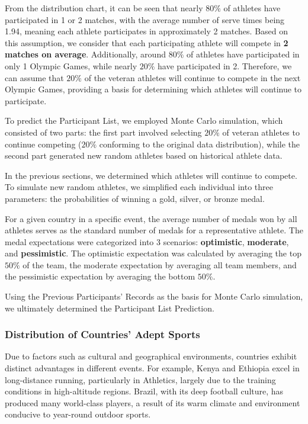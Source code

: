 \documentclass[12pt]{article}  %
\begin{document}
From the distribution chart, it can be seen that nearly \( 80\% \) of athletes have participated in 1 or 2 matches, with the average number of serve times being 1.94, meaning each athlete participates in approximately 2 matches. Based on this assumption, we consider that each participating athlete will compete in \textbf{2 matches on average}. Additionally, around \( 80\% \) of athletes have participated in only 1 Olympic Games, while nearly \( 20\% \) have participated in 2. Therefore, we can assume that \( 20\% \) of the veteran athletes will continue to compete in the next Olympic Games, providing a basis for determining which athletes will continue to participate.

To predict the Participant List, we employed Monte Carlo simulation, which consisted of two parts: the first part involved selecting \( 20\% \) of veteran athletes to continue competing (\( 20\% \) conforming to the original data distribution), while the second part generated new random athletes based on historical athlete data.

In the previous sections, we determined which athletes will continue to compete. To simulate new random athletes, we simplified each individual into three parameters: the probabilities of winning a gold, silver, or bronze medal.

For a given country in a specific event, the average number of medals won by all athletes serves as the standard number of medals for a representative athlete. The medal expectations were categorized into 3 scenarios: \textbf{optimistic}, \textbf{moderate}, and \textbf{pessimistic}. The optimistic expectation was calculated by averaging the top \( 50\% \) of the team, the moderate expectation by averaging all team members, and the pessimistic expectation by averaging the bottom \( 50\% \).

Using the Previous Participants' Records as the basis for Monte Carlo simulation, we ultimately determined the Participant List Prediction.



\subsubsection{Distribution of Countries' Adept Sports}
Due to factors such as cultural and geographical environments, countries exhibit distinct advantages in different events. For example, Kenya and Ethiopia excel in long-distance running, particularly in Athletics, largely due to the training conditions in high-altitude regions. Brazil, with its deep football culture, has produced many world-class players, a result of its warm climate and environment conducive to year-round outdoor sports.
\end{document}
